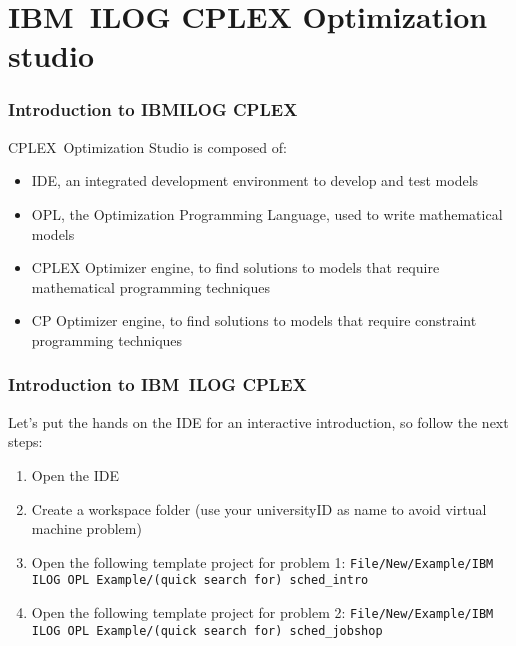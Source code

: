 



\section{IBM\cmark~ILOG CPLEX Optimization studio}

\begin{frame} \frametitle{Introduction to IBM\cmark ILOG CPLEX}
\pause		
CPLEX\rmark~Optimization Studio is composed of:\pause

\begin{itemize}[<+->]
\item IDE, an integrated development environment to develop and test models
\item OPL, the Optimization Programming Language, used to write mathematical models
\item CPLEX Optimizer engine, to find solutions to models that require mathematical programming techniques
\item CP Optimizer engine, to find solutions to models that require constraint programming techniques
\end{itemize}
	
\end{frame}


\begin{frame} \frametitle{Introduction to IBM\cmark~ILOG CPLEX}
\pause
Let's put the hands on the IDE for an interactive introduction, so follow the next steps:\pause

\begin{enumerate}[<+->]
\item Open the IDE
\item Create a workspace folder (use your universityID as name to avoid virtual machine problem)
\item Open the following template project for problem 1: \texttt{File/New/Example/IBM ILOG OPL Example/(quick search for) sched\_intro} 
\item Open the following template project for problem 2:
\texttt{File/New/Example/IBM ILOG OPL Example/(quick search for) sched\_jobshop}
\end{enumerate}

\end{frame}


